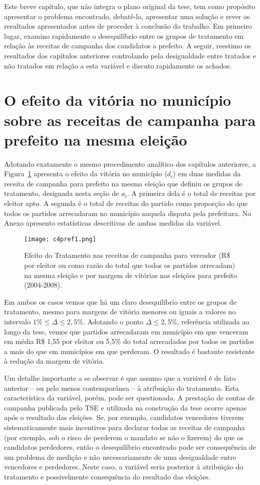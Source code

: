 Este breve capítulo, que não integra o plano original da tese, tem como propósito apresentar o problema encontrado, debatê-lo, apresentar uma solução e rever os resultados apresentados antes de proceder à conclusão do trabalho. Em primeiro lugar, examino rapidamente o desequilíbrio entre os grupos de tratamento em relação às receitas de campanha dos candidatos a prefeito. A seguir, reestimo os resultados dos capítulos anteriores controlando pela desigualdade entre tratados e não tratados em relação a esta variável e discuto rapidamente os achados.

\section{O efeito da vitória no município sobre as receitas de campanha para prefeito na mesma eleição}

Adotando exatamente o mesmo procedimento analítico dos capítulos anteriores, a Figura~\ref{fig:c4g1} apresenta o efeito da vitória no município ($d_{i}$) em duas medidas da receita de campanha para prefeito na mesma eleição que definiu os grupos de tratamento, designada nesta seção de $a_{i}$. A primeira dela é o total de receitas por eleitor apto. A segunda é o total de receitas do partido como proporção do que todos os partidos arrecadaram no município naquela disputa pela prefeitura. No Anexo apresento estatísticas descritivas de ambas medidas da variável. 

\begin{figure}[htp]
	\centering
	\texttt{[image: c4pref1.png]}
	\caption{Efeito do Tratamento nas receitas de campanha para vereador (R\$ por eleitor ou como razão do total que todos os partidos arrecadam) na mesma eleição e por margem de vitórias nas eleições para prefeito (2004-2008).}
	\label{fig:c4g1}
\end{figure}

Em ambos os casos vemos que há um claro desequilíbrio entre os grupos de tratamento, mesmo para margens de vitória menores ou iguais a valores no intervalo $1\% \leq \Delta \leq 2,5\%$. Adotando o ponto $\Delta \leq 2,5\%$, referência utilizada ao longo da tese, vemos que partidos arrecadaram em município em que venceram em média R\$ 1,55 por eleitor ou 5,5\% do total arrecadados por todos os partidos a mais do que em municípios em que perderam. O resultado é bastante resistente à redução da margem de vitória.

Um detalhe importante a se observar é que assumo que a variável é de fato anterior -- ou pelo menos contemporânea -- à atribuição do tratamento. Esta característica da variável, porém, pode ser questionada. A prestação de contas de campanha publicada pelo TSE e utilizada na construção da tese ocorre apenas após o resultado das eleições. Se, por exemplo, candidatos vencedores tiverem sistematicamente mais incentivos para declarar todas as receitas de campanha (por exemplo, sob o risco de perderem o mandato se não o fizerem) do que os candidatos perdedores, então o desequilíbrio encontrado pode ser consequência de um problema de medição e não necessariamente de uma desigualdade entre vencedores e perdedores. Neste caso, a variável seria posterior à atribuição do tratamento e possivelmente consequência do resultado das eleições.

